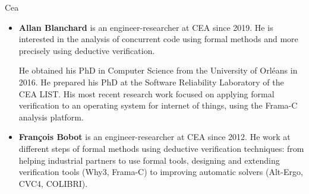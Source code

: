 \begin{sitedescription}{Cea}
\begin{itemize}
\item{\bf Allan Blanchard} is an engineer-researcher at CEA since 2019. He is
  interested in the analysis of concurrent code using formal methods and more
  precisely using deductive verification.

  He obtained his PhD in Computer Science from the University of Orléans in
  2016. He prepared his PhD at the Software Reliability Laboratory of the CEA
  LIST. His most recent research work focused on applying formal verification to
  an operating system for internet of things, using the Frama-C analysis
  platform.
\item{\bf François Bobot} is an engineer-researcher at CEA since 2012. He work
  at different steps of formal methods using deductive verification techniques:
  from helping industrial partners to use formal tools, designing and extending
  verification tools (Why3, Frama-C) to improving automatic solvers (Alt-Ergo,
  CVC4, COLIBRI).
\end{itemize}

\end{sitedescription}


